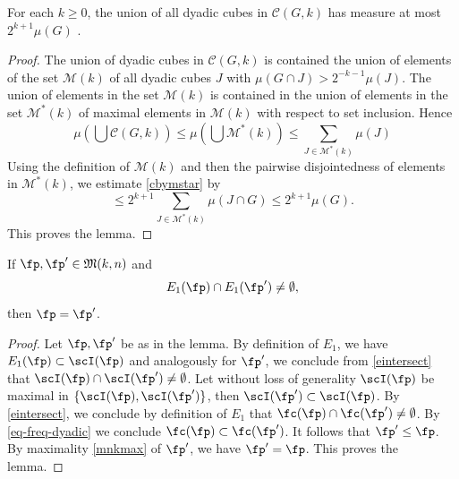 \begin{lemma}
\label{dense-cover}
\leanok
{}

For each $k\ge 0$, the union of all dyadic cubes
in $\mathcal{C}(G,k)$ has measure at most $2^{k+1} \mu(G)$ .
\end{lemma}
\begin{proof}
\leanok
The union of dyadic cubes in $\mathcal{C}(G,k)$
is contained the union of elements of the set $\mathcal{M}(k)$
of all dyadic cubes $J$ with
${\mu(G \cap J)} > 2^{-k-1}{\mu(J)}$.
The union of elements in the set $\mathcal{M}(k)$ is contained in the union of elements in
the set $\mathcal{M}^*(k)$ of maximal elements in
$\mathcal{M}(k)$ with respect to set inclusion. Hence
\begin{equation}\label{cbymstar}
\mu (\bigcup \mathcal{C}(G,k))\le \mu (\bigcup \mathcal{M}^*(k))\le
\sum_{J\in \mathcal{M}^*(k)}\mu(J)
\end{equation}
Using the definition of $\mathcal{M}(k)$ and then
the pairwise disjointedness of elements in
$\mathcal{M}^*(k)$,
we estimate \eqref{cbymstar} by
\begin{equation}
\le
2^{k+1}\sum_{J\in \mathcal{M}^*(k)}\mu(J\cap G)
\le 2^{k+1}\mu(G).
\end{equation}
This proves the lemma.
\end{proof}

\begin{lemma}
    \label{pairwise-disjoint}
    \leanok
    If $\fp, \fp' \in {\mathfrak{M}}(k,n)$ and
    \begin{equation}\label{eintersect}
        {E_1}(\fp)\cap {E_1}(\fp')\neq \emptyset,
    \end{equation}
    then $\fp=\fp'$.
\end{lemma}
\begin{proof}
\leanok
Let $\fp,\fp'$ be as in the lemma. By definition of $E_1$,
we have
$E_1(\fp)\subset \scI(\fp)$ and analogously for $\fp'$, we conclude from \eqref{eintersect} that $\scI(\fp)\cap \scI(\fp')\neq \emptyset$. Let without loss of generality $\scI(\fp)$ be maximal in
$\{\scI(\fp),\scI(\fp')\}$, then $\scI(\fp')\subset \scI(\fp)$.
By \eqref{eintersect}, we conclude by definition of $E_1$ that $\fc(\fp)\cap \fc(\fp')\neq \emptyset$. By
\eqref{eq-freq-dyadic} we conclude $\fc(\fp)\subset \fc(\fp')$. It follows that $\fp'\le \fp$. By maximality
\eqref{mnkmax}
of $\fp'$, we have $\fp'=\fp$. This proves the lemma.
\end{proof}


